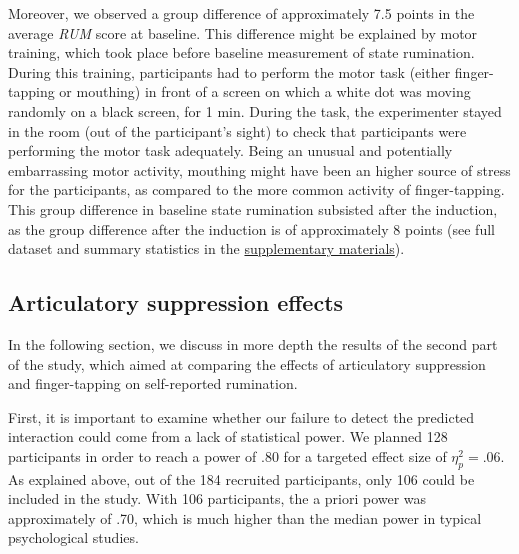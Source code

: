 \documentclass[12pt,]{book}
\begin{document}
Moreover, we observed a group difference of approximately 7.5 points in
the average \emph{RUM} score at baseline. This difference might be
explained by motor training, which took place before baseline
measurement of state rumination. During this training, participants had
to perform the motor task (either finger-tapping or mouthing) in front
of a screen on which a white dot was moving randomly on a black screen,
for 1 min. During the task, the experimenter stayed in the room (out of
the participant's sight) to check that participants were performing the
motor task adequately. Being an unusual and potentially embarrassing
motor activity, mouthing might have been an higher source of stress for
the participants, as compared to the more common activity of
finger-tapping. This group difference in baseline state rumination
subsisted after the induction, as the group difference after the
induction is of approximately 8 points (see full dataset and summary
statistics in the \protect\hyperlink{supp}{supplementary materials}).

\subsection{Articulatory suppression
effects}\label{articulatory-suppression-effects-1}

In the following section, we discuss in more depth the results of the
second part of the study, which aimed at comparing the effects of
articulatory suppression and finger-tapping on self-reported rumination.

First, it is important to examine whether our failure to detect the
predicted interaction could come from a lack of statistical power. We
planned 128 participants in order to reach a power of .80 for a targeted
effect size of \(\eta_{p}^{2}=.06\). As explained above, out of the 184
recruited participants, only 106 could be included in the study. With
106 participants, the a priori power was approximately of .70, which is
much higher than the median power in typical psychological studies.
\end{document}
